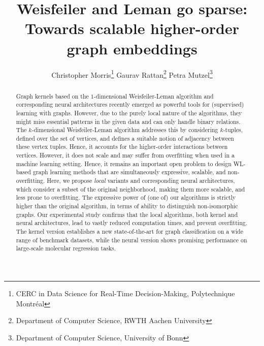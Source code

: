 \documentclass{article}
\title{Weisfeiler and Leman go sparse: Towards scalable higher-order graph embeddings}
\author{Christopher Morris\thanks{CERC in Data Science for Real-Time Decision-Making, Polytechnique Montr{\'e}al} \And Gaurav Rattan\thanks{Department of Computer Science, RWTH Aachen University} \And Petra Mutzel\thanks{Department of Computer Science, University of Bonn}
}
\theoremstyle{definition}
\newcommand{\new}[1]{\emph{#1}}
\begin{document}
\maketitle

\begin{abstract}
Graph kernels based on the $1$-dimensional Weisfeiler-Leman algorithm and corresponding neural architectures recently emerged as powerful tools for (supervised) learning with graphs. However, due to the purely local nature of the algorithms, they might miss essential patterns in the given data and can only handle binary relations. The $k$-dimensional Weisfeiler-Leman algorithm addresses this by considering $k$-tuples, defined over the set of vertices, and defines a suitable notion of adjacency between these vertex tuples. Hence, it accounts for the higher-order interactions between vertices. However, it does not scale and may suffer from overfitting when used in a machine learning setting. Hence, it remains an important open problem to design WL-based graph learning methods that are simultaneously expressive, scalable, and non-overfitting. Here, we propose \new{local} variants and corresponding neural architectures, which consider a subset of the original neighborhood, making them more scalable, and less prone to overfitting. The expressive power of (one of) our algorithms is strictly higher than the original algorithm, in terms of ability to distinguish non-isomorphic graphs. Our experimental study confirms that the local algorithms, both kernel and neural architectures, lead to vastly reduced computation times, and prevent overfitting. The kernel version establishes a new state-of-the-art for graph classification on a wide range of benchmark datasets, while the neural version shows promising performance on large-scale molecular regression tasks.
\end{abstract}
\end{document}
